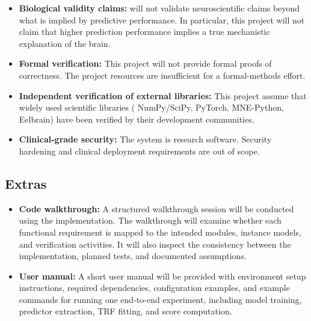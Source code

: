 \documentclass[12pt, titlepage]{article}
\begin{document}
\begin{itemize}
  \item \textbf{Biological validity claims:} \progname{} will not validate neuroscientific claims beyond what is implied by predictive performance. In particular, this project will not claim that higher prediction performance implies a true mechanistic explanation of the brain.
  \item \textbf{Formal verification:} This project will not provide formal proofs of correctness. 
  The project resources are insufficient for a formal-methods effort.
  \item \textbf{Independent verification of external libraries:} This project assume that widely used scientific libraries ( NumPy/SciPy, PyTorch, MNE-Python, Eelbrain) have been verified by their development
  communities.
  \item \textbf{Clinical-grade security:} The system is research
  software. Security hardening and clinical deployment requirements are out of scope.
\end{itemize}







\subsection{Extras}


\begin{itemize}
  \item \textbf{Code walkthrough:} A structured walkthrough session will be conducted using the implementation. The walkthrough will examine whether each functional requirement is mapped to the intended modules, instance models, and verification activities. It will also inspect the consistency between the implementation, planned tests, and documented assumptions.
  
  \item \textbf{User manual:} A short user manual will be provided with environment setup instructions, required dependencies, configuration examples, and example commands for running one end-to-end experiment, including model training, predictor extraction, TRF fitting, and score computation.
\end{itemize}
\end{document}
